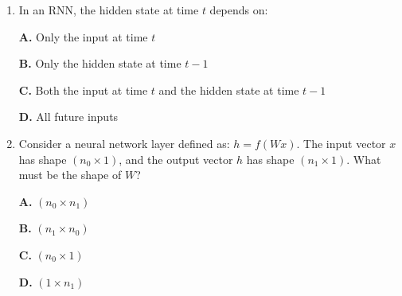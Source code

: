 \documentclass[11pt]{article}
\begin{document}
\begin{enumerate}[label=Q\arabic*., leftmargin=*]
\textbf{A.} The next word given the predicted history

\textbf{B.} The next word given the ground-truth history

\textbf{C.} The current word given itself

\textbf{D.} All words simultaneously

\item In an RNN, the hidden state at time $t$ depends on:

\textbf{A.} Only the input at time $t$

\textbf{B.} Only the hidden state at time $t-1$

\textbf{C.} Both the input at time $t$ and the hidden state at time $t-1$

\textbf{D.} All future inputs

\item Consider a neural network layer defined as: $h = f(Wx)$. The input vector $x$ has shape $(n_0 \times 1)$, and the output vector $h$ has shape $(n_1 \times 1)$. What must be the shape of $W$?

\textbf{A.} $(n_0 \times n_1)$

\textbf{B.} $(n_1 \times n_0)$

\textbf{C.} $(n_0 \times 1)$

\textbf{D.} $(1 \times n_1)$


\end{enumerate}
\end{document}
